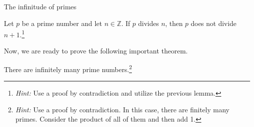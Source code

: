\begin{section}{The infinitude of primes}
\begin{lemma}\label{lem:plus1}
Let $p$ be a prime number  and let $n\in \mathbb{Z}$. If $p$ divides $n$, then $p$ does not divide $n+1$.\footnote{\emph{Hint:} Use a proof by contradiction and utilize the previous lemma.}
\end{lemma}

Now, we are ready to prove the following important theorem.

\begin{theorem}\label{thm:infprimes}
There are infinitely many prime numbers.\footnote{\emph{Hint:} Use a proof by contradiction.  In this case, there are finitely many primes.  Consider the product of all of them and then add 1.}
\end{theorem}

\end{section}




